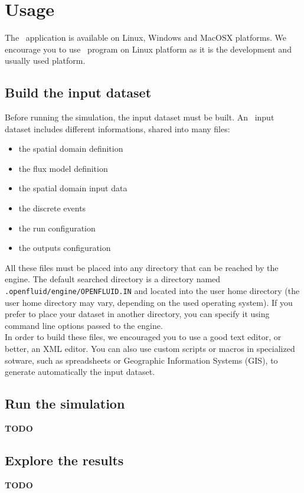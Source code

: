 \chapter{Usage}

The \OFEname \ application is available on Linux, Windows and MacOSX platforms.
We encourage you to use \OFEname \ program on Linux platform as it is the development and usually used platform. 

\section{Build the input dataset}

Before running the simulation, the input dataset must be built.
An \OFEname \ input dataset includes different informations, shared into many files:
\begin{itemize}
  \item the spatial domain definition
  \item the flux model definition
  \item the spatial domain input data 
  \item the discrete events
  \item the run configuration
  \item the outputs configuration
\end{itemize}

\noindent All these files must be placed into any directory that can be reached by the
engine. The default searched directory is a directory named
\texttt{.openfluid/engine/OPENFLUID.IN} and located into the user home
directory (the user home directory may vary, depending on the used operating
system). If you prefer to place your dataset in another directory, you can
specify it using command line options passed to the engine.\\

\noindent In order to build these files, we encouraged you to use a good text editor, or better, an XML editor.
You can also use custom scripts or macros in specialized sotware, such as spreadsheets or Geographic Information Systems (GIS), to generate automatically the input dataset.

\bigskip

\section{Run the simulation}

\textbf{TODO}

\bigskip

\section{Explore the results}

\textbf{TODO}
